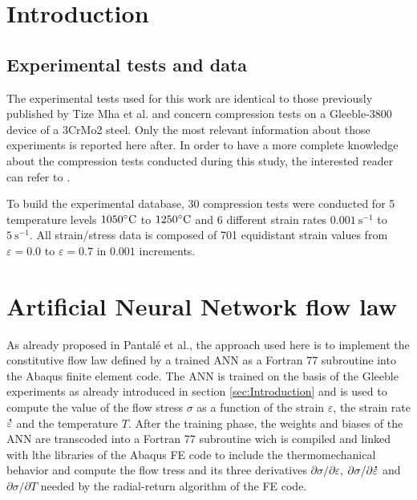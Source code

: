 \documentclass[algorithms,article,submit,pdftex,moreauthors]{Definitions/mdpi}
\makeatletter
\DeclareRobustCommand{\mdot}[1]{\accentset{\mbox{\bfseries .}}{#1}}
\DeclareRobustCommand{\eal}{et al.\@\xspace}
\DeclareRobustCommand{\ps}{\text{s}^{-1}}
\makeatother
\begin{document}
\section{Introduction\label{sec:Introduction}}

\subsection{Experimental tests and data}
The experimental tests used for this work are identical to those previously published by Tize Mha \eal \cite{Tize-2023-IEP} and concern compression tests on a Gleeble-3800 device of a 3CrMo2 steel.
Only the most relevant information about those experiments is reported here after.
In order to have a more complete knowledge about the compression tests conducted during this study, the interested reader can refer to \cite{Tize-2023-IEP}.

To build the experimental database, 30 compression tests were conducted for 5 temperature levels $1050\celsius$ to $1250\celsius$ and 6 different strain rates $0.001~\ps$ to $5~\ps$.
All strain/stress data is composed of 701 equidistant strain values from $\varepsilon=0.0$ to $\varepsilon=0.7$ in $0.001$ increments.

\section{Artificial Neural Network flow law\label{sec:ANN}}
As already proposed in Pantalé \eal \cite{Pantale-2021-EIN, Pantale-2023-DIA}, the approach used here is to implement the constitutive flow law defined by a trained ANN as a Fortran 77 subroutine into the Abaqus finite element code. 
The ANN is trained on the basis of the Gleeble experiments as already introduced in section \ref{sec:Introduction} and is used to compute the value of the flow stress $\sigma$ as a function of the strain $\varepsilon$, the strain rate $\mdot{\varepsilon}$ and the temperature $T$.
After the training phase, the weights and biases of the ANN are transcoded into a Fortran 77 subroutine wich is compiled and linked with lthe libraries of the Abaqus FE code to include the thermomechanical behavior and compute the flow tress and its three derivatives $\partial\sigma/\partial\varepsilon$, $\partial\sigma/\partial\mdot{\varepsilon}$ and $\partial\sigma/\partial T$ needed by the radial-return algorithm of the FE code.
\end{document}
